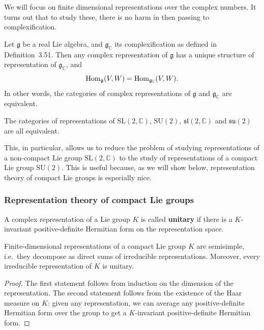 \documentclass[12pt]{article}
\begin{document}
We will focus on finite dimensional representations over the complex numbers. It turns out that to study these, there is no harm in then passing to complexification.

\begin{lemma}
    Let $\mathfrak g$ be a real Lie algebra, and $\mathfrak g_{\mathbb C}$ its
    complexification as defined in Definition~3.51. Then any complex representation
    of $\mathfrak g$ has a unique structure of representation of
    $\mathfrak g_{\mathbb C}$, and
    \[
        \operatorname{Hom}_{\mathfrak g}(V,W)=\operatorname{Hom}_{\mathfrak g_{\mathbb C}}(V,W).
    \]
    In other words, the categories of complex representations of $\mathfrak g$
    and $\mathfrak g_{\mathbb C}$ are equivalent.
\end{lemma}

\begin{example}
    The categories of representations of $\mathrm{SL}(2,\mathbb C)$,
    $\mathrm{SU}(2)$, $\mathfrak{sl}(2,\mathbb C)$ and $\mathfrak{su}(2)$
    are all equivalent.
\end{example}

This, in particular, allows us to reduce the problem of studying
representations of a non-compact Lie group $\mathrm{SL}(2,\mathbb C)$
to the study of representations of a compact Lie group $\mathrm{SU}(2)$. This is useful because, as we will show below, representation theory of compact Lie groups is especially nice.

\subsubsection{Representation theory of compact Lie groups}

\begin{definition}
    A complex representation of a Lie group $K$ is called \textbf{unitary} if there is a $K$-invariant positive-definite Hermitian form on the representation space.
\end{definition}

\begin{theorem}
    Finite-dimensional representations of a compact Lie group $K$ are semisimple, i.e.\ they decompose as direct sums of irreducible representations. Moreover, every irreducible representation of $K$ is unitary.
\end{theorem}

\begin{proof}
    The first statement follows from induction on the dimension of the representation. The second statement follows from the existence of the Haar measure on $K$: given any representation, we can average any positive-definite Hermitian form over the group to get a $K$-invariant positive-definite Hermitian form.
\end{proof}
\end{document}
